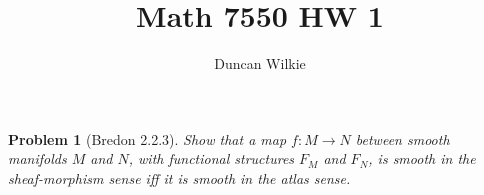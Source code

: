 \documentclass{article}
\title{Math 7550 HW 1}
\author{Duncan Wilkie}
\date{}
\newtheorem{plm}{Problem}
\begin{document}
\maketitle





\begin{plm}[Bredon 2.2.3]
  Show that a map $f: M \to N$ between smooth manifolds $M$ and $N$, with functional structures $F_{M}$ and $F_{N}$,
  is smooth in the sheaf-morphism sense iff it is smooth in the atlas sense.
\end{plm}
\end{document}
